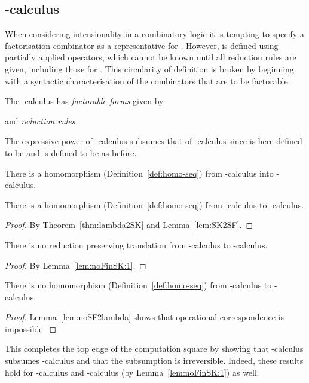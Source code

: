 \documentclass{llncs}
\begin{document}
\subsection{-calculus}
\label{ssec:computation:sec:factor}

When considering intensionality in a combinatory logic it is tempting to specify
a factorisation combinator  as a representative for .
However,  is defined using partially applied operators,
which cannot be known until all reduction rules are given,
including those for .
This circularity of definition is broken by beginning with a syntactic
characterisation of the combinators that are to be factorable.
 
The -calculus \cite{JayGW11} has {\em factorable forms} given by

and {\em reduction rules} 


The expressive power of -calculus subsumes that of -calculus
since  is here defined to be  and  is defined to be 
as before.

\begin{lemma}
\label{lem:SK2SF}
There is a homomorphism (Definition~\ref{def:homo-seq}) from -calculus into -calculus.
\end{lemma}

\begin{theorem}
\label{thm:lambdav2SF}
There is a homomorphism (Definition~\ref{def:homo-seq}) from -calculus to -calculus.
\end{theorem}
\begin{proof}
By Theorem~\ref{thm:lambda2SK} and Lemma~\ref{lem:SK2SF}.
\end{proof}


\begin{lemma}
\label{lem:noSF2lambda}
There is no reduction preserving translation  from -calculus to -calculus.
\end{lemma}
\begin{proof}
By Lemma~\ref{lem:noFinSK:1}.
\end{proof}

\begin{theorem}
\label{thm:noSF2lambda}
There is no homomorphism (Definition~\ref{def:homo-seq}) from -calculus to -calculus.
\end{theorem}
\begin{proof}
Lemma~\ref{lem:noSF2lambda} shows that operational correspondence is impossible.
\end{proof}

This completes the top edge of the computation square by showing that
-calculus subsumes -calculus and that the subsumption is
irreversible.
Indeed, these results hold for -calculus \cite[Theorem~5.2.6]{GivenWilsonPHD} and
-calculus (by Lemma~\ref{lem:noFinSK:1}) as well.
\end{document}
